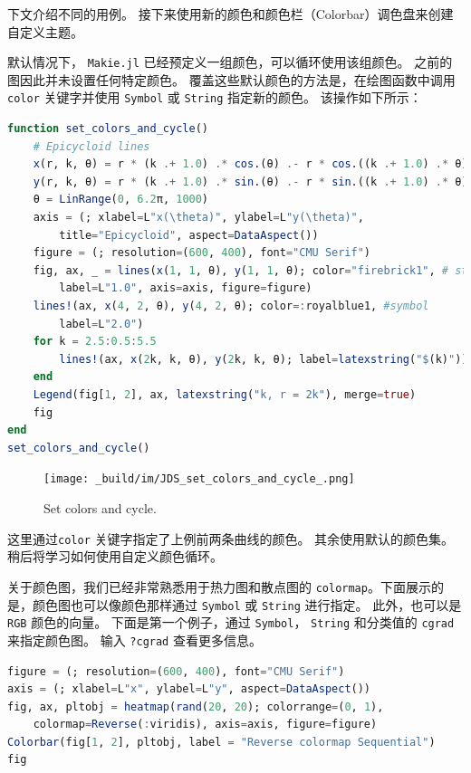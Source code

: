\documentclass[
  notoc %
]{tufte-book}
\newcommand{\passthrough}[1]{#1}
\begin{document}
下文介绍不同的用例。
接下来使用新的颜色和颜色栏（Colorbar）调色盘来创建自定义主题。

默认情况下， \passthrough{\lstinline!Makie.jl!}
已经预定义一组颜色，可以循环使用该组颜色。
之前的图因此并未设置任何特定颜色。
覆盖这些默认颜色的方法是，在绘图函数中调用
\passthrough{\lstinline!color!} 关键字并使用
\passthrough{\lstinline!Symbol!} 或 \passthrough{\lstinline!String!}
指定新的颜色。 该操作如下所示：

\begin{lstlisting}[language=Julia]
function set_colors_and_cycle()
    # Epicycloid lines
    x(r, k, θ) = r * (k .+ 1.0) .* cos.(θ) .- r * cos.((k .+ 1.0) .* θ)
    y(r, k, θ) = r * (k .+ 1.0) .* sin.(θ) .- r * sin.((k .+ 1.0) .* θ)
    θ = LinRange(0, 6.2π, 1000)
    axis = (; xlabel=L"x(\theta)", ylabel=L"y(\theta)",
        title="Epicycloid", aspect=DataAspect())
    figure = (; resolution=(600, 400), font="CMU Serif")
    fig, ax, _ = lines(x(1, 1, θ), y(1, 1, θ); color="firebrick1", # string
        label=L"1.0", axis=axis, figure=figure)
    lines!(ax, x(4, 2, θ), y(4, 2, θ); color=:royalblue1, #symbol
        label=L"2.0")
    for k = 2.5:0.5:5.5
        lines!(ax, x(2k, k, θ), y(2k, k, θ); label=latexstring("$(k)")) #cycle
    end
    Legend(fig[1, 2], ax, latexstring("k, r = 2k"), merge=true)
    fig
end
set_colors_and_cycle()
\end{lstlisting}

\begin{figure}
\hypertarget{fig:set_colors_and_cycle}{%
\centering
\texttt{[image: \_build/im/JDS\_set\_colors\_and\_cycle\_.png]}
\caption{Set colors and cycle.}\label{fig:set_colors_and_cycle}
}
\end{figure}

这里通过\passthrough{\lstinline!color!}
关键字指定了上例前两条曲线的颜色。 其余使用默认的颜色集。
稍后将学习如何使用自定义颜色循环。

关于颜色图，我们已经非常熟悉用于热力图和散点图的
\passthrough{\lstinline!colormap!}。下面展示的是，颜色图也可以像颜色那样通过
\passthrough{\lstinline!Symbol!} 或 \passthrough{\lstinline!String!}
进行指定。 此外，也可以是 \passthrough{\lstinline!RGB!} 颜色的向量。
下面是第一个例子，通过 \passthrough{\lstinline!Symbol!}，
\passthrough{\lstinline!String!} 和分类值的
\passthrough{\lstinline!cgrad!} 来指定颜色图。 输入
\passthrough{\lstinline!?cgrad!} 查看更多信息。

\begin{lstlisting}[language=Julia]
figure = (; resolution=(600, 400), font="CMU Serif")
axis = (; xlabel=L"x", ylabel=L"y", aspect=DataAspect())
fig, ax, pltobj = heatmap(rand(20, 20); colorrange=(0, 1),
    colormap=Reverse(:viridis), axis=axis, figure=figure)
Colorbar(fig[1, 2], pltobj, label = "Reverse colormap Sequential")
fig
\end{lstlisting}
\end{document}
